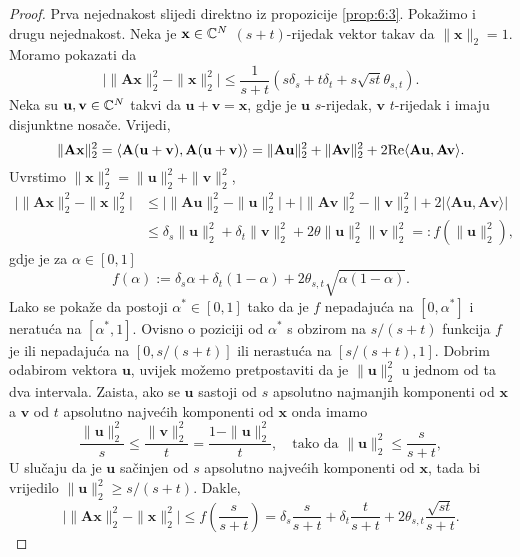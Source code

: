 \documentclass[a4paper,twoside,12pt]{memoir} %
\newcommand{\vect}[1]{\mathbf{#1}}
\renewcommand{\vec}{\vect}
\newcommand{\norm}[1]{\|{#1}\|}
\renewcommand{\Re}{\text{\normalfont{Re}}}
\begin{document}
\begin{proof}
    Prva nejednakost slijedi direktno iz propozicije \ref{prop:6:3}. Poka\v{z}imo i drugu nejednakost. Neka je $\vec x \in \C^N$ $(s+t)$-rijedak vektor takav da $\norm{\vec x}_2 = 1$. Moramo pokazati da
    \begin{equation*}
        \big |\norm{\vec{Ax}}_2^2 - \norm{\vec x}_2^2 \big |  \leq \frac{1}{s+t} (s \delta_s + t \delta_t + s \sqrt{st} \theta_{s,t}).
    \end{equation*}
    Neka su $\vec u, \vec v \in \C^N$ takvi da $\vec u + \vec v = \vec x$, gdje je $\vec u$ $s$-rijedak, $\vec v$ $t$-rijedak i imaju disjunktne nosa\v{c}e. Vrijedi, 
    \begin{equation*}
        \norm{\vec{Ax}}_2^2 = \langle \vec A(\vec u + \vec v) , \vec A(\vec u + \vec v) \rangle = \norm{\vec{Au}}_2^2 + \norm{\vec{Av}}_2^2 + 2 \Re \langle \vec{Au}, \vec{Av} \rangle.
    \end{equation*}
    Uvrstimo $\norm{\vec x}_2^2 = \norm{\vec u}_2^2 + \norm{\vec v}_2^2$,
    \begin{align*}
        \big |\norm{\vec{Ax}}_2^2 - \norm{\vec x}_2^2 \big | &\leq \big |\norm{\vec{Au}}_2^2 - \norm{\vec u }_2^2 \big | + \big |\norm{\vec{Av}}_2^2 - \norm{\vec v}_2^2 \big | + 2 \big |\langle  \vec{Au}, \vec{Av} \rangle \big | \\
        &\leq \delta_s \norm{\vec u }_2^2 + \delta_t \norm{\vec v }_2^2 + 2 \theta \norm{\vec u}_2^2 \norm{\vec v }_2^2 =: f(\norm{\vec u}^2_2),
    \end{align*}
    gdje je za $\alpha \in [0,1]$
    \begin{equation}\label{6:6}
        f(\alpha) := \delta_s \alpha + \delta_t(1-\alpha) + 2 \theta_{s,t} \sqrt{\alpha(1- \alpha)}.
    \end{equation}
    Lako se poka\v{z}e da postoji $\alpha^* \in [0,1]$ tako da je $f$ nepadaju\'ca na $[0, \alpha^*]$ i neratu\'ca na $[\alpha^*, 1]$. Ovisno o poziciji od $\alpha^*$ s obzirom na $s/(s+t)$ funkcija $f$ je ili nepadaju\'ca na $[0, s/(s+t)]$ ili nerastu\'ca na $[s/(s+t), 1]$. Dobrim odabirom vektora $\vec u$, uvijek mo\v{z}emo pretpostaviti da je $\norm{\vec u}_2^2$ u jednom od ta dva intervala. Zaista, ako se $\vec u$ sastoji od $s$ apsolutno najmanjih komponenti od $\vec x$ a $\vec v$ od $t$ apsolutno najve\'cih komponenti od $\vec x$ onda imamo
    \begin{equation*}
        \frac{\norm{\vec u}_2^2}{s} \leq \frac{\norm{\vec v}_2^2}{t} = \frac{1 - \norm{\vec u}_2^2}{t}, \quad \text{tako da } \norm{\vec u}_2^2 \leq \frac{s}{s+t},     
    \end{equation*}
    U slu\v{c}aju da je $\vec u$ sa\v{c}injen od $s$ apsolutno najve\'cih komponenti od $\vec x$, tada bi vrijedilo $\norm{\vec u}_2^2 \geq s/(s+t)$. Dakle, 
    \begin{equation*}
        \big | \norm{\vec{Ax}}_2^2 - \norm{\vec x}_2^2 \big | \leq f(\frac{s}{s+t}) = \delta_s \frac{s}{s+t} + \delta_t \frac{t}{s+t} + 2 \theta_{s,t} \frac{\sqrt{st}}{s+t} .
    \end{equation*}
\end{proof}
\end{document}

